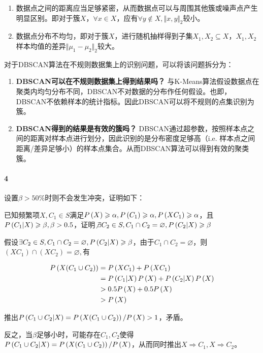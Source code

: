 \documentclass{../notes}
\begin{document}
    \begin{enumerate}
        \item 数据点之间的距离应当足够紧密，从而数据点可以与周围其他簇或噪声点产生明显区别。即对于簇$X$，$\forall x\in X$，应有$\forall y\not \in X, \Vert x, y\Vert_2$较小。
        \item 数据点分布不均匀，即对于簇$X$，进行随机抽样得到子集$X_1, X_2\subseteq X$，$X_1, X_2$样本均值的差异$\Vert \mu_{1} - \mu_{2}\Vert_2$较大。
    \end{enumerate}

    对于DBSCAN算法在不规则数据集上的识别问题，可以将该问题拆分为：

    \begin{enumerate}
        \item \textbf{DBSCAN可以在不规则数据集上得到结果吗？} 与K-Means算法假设数据点在聚类内均匀分布不同，DBSCAN不对数据的分布作任何假设。也即，DBSCAN不依赖样本的统计指标。因此DBSCAN可以将不规则的点集识别为簇。
        \item \textbf{DBSCAN得到的结果是有效的簇吗？} DBSCAN通过超参数，按照样本点之间的距离对样本点进行划分，因此识别的是分布密度足够高（i.e. 样本点之间距离/差异足够小）的样本点集合。从而DBSCAN算法可以得到有效的聚类簇。
    \end{enumerate}
    
    \paragraph*{4} 设置$\beta > 50\%$时则不会发生冲突，证明如下：

    已知频繁项$X, C_1\in S$满足$P\left(X\right)\geqslant \alpha, P\left(C_1\right)\geqslant \alpha, P\left(XC_1\right)\geqslant \alpha$，且$P\left(C_1|X\right)\geqslant \beta, \beta > 0.5$，证明$\not \exists C_2\in S, C_1\cap C_2 = \varnothing, P\left(C_2|X\right)\geqslant \beta$

    假设$\exists C_2\in S, C_1\cap C_2 = \varnothing, P\left(C_2|X\right)\geqslant \beta$，由于$C_1\cap C_2 = \varnothing$，则$(XC_1)\cap (XC_2) = \varnothing,$有

    \begin{equation}
        \begin{aligned}
            P\left(X(C_1\cup C_2)\right) &= P\left(XC_1\right) + P\left(XC_1\right) \\
            &= P\left(C_1|X\right)P\left(X\right) + P\left(C_2|X\right)P\left(X\right) \\
            &> 0.5P\left(X\right) + 0.5P\left(X\right) \\
            &> P\left(X\right)
        \end{aligned}
    \end{equation}

    推出$P\left(C_1\cup C_2|X\right) = P\left(X(C_1\cup C_2)\right) / P\left(X\right) > 1$，矛盾。

    反之，当$\beta$足够小时，可能存在$C_1, C_2$使得$P\left(C_1\cup C_2|X\right) = P\left(X(C_1\cup C_2)\right) / P\left(X\right)$，从而同时推出$X\Rightarrow C_1, X\Rightarrow C_2$。
\end{document}
